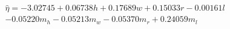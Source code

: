 \begin{align*}
\widehat\eta=-3.02745+0.06738h+0.17689w+0.15033r-0.00161l\\-0.05220m_h-0.05213m_w-0.05370m_r+0.24059m_l
\end{align*}
